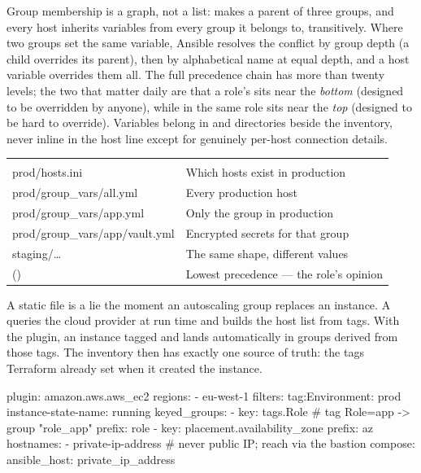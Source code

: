  Group membership is a graph, not a list:  makes  a parent of three groups, and every host inherits variables from every group it belongs to, transitively. Where two groups set the same variable, Ansible resolves the conflict by group depth (a child overrides its parent), then by alphabetical name at equal depth, and a host variable overrides them all. The full precedence chain has more than twenty levels; the two that matter daily are that a role's  sits near the \emph{bottom} (designed to be overridden by anyone), while  in the same role sits near the \emph{top} (designed to be hard to override). Variables belong in  and  directories beside the inventory, never inline in the host line except for genuinely per-host connection details.

\begin{center}\small
\wbrowcolors
\begin{tabularx}{\linewidth}{@{}L{50mm} X@{}}
 & \\
prod/hosts.ini & Which hosts exist in production\\
prod/group\_vars/all.yml & Every production host\\
prod/group\_vars/app.yml & Only the  group in production\\
prod/group\_vars/app/vault.yml & Encrypted secrets for that group\\
staging/\ldots & The same shape, different values\\
() & Lowest precedence --- the role's opinion\\
\end{tabularx}
\end{center}

 A static file is a lie the moment an autoscaling group replaces an instance. A  queries the cloud provider at run time and builds the host list from tags. With the  plugin, an instance tagged  and  lands automatically in groups derived from those tags. The inventory then has exactly one source of truth: the tags Terraform already set when it created the instance.

\begin{yamlbox}
plugin: amazon.aws.aws_ec2
regions:
  - eu-west-1
filters:
  tag:Environment: prod
  instance-state-name: running
keyed_groups:
  - key: tags.Role          # tag Role=app  -> group "role_app"
    prefix: role
  - key: placement.availability_zone
    prefix: az
hostnames:
  - private-ip-address     # never public IP; reach via the bastion
compose:
  ansible_host: private_ip_address
\end{yamlbox}


